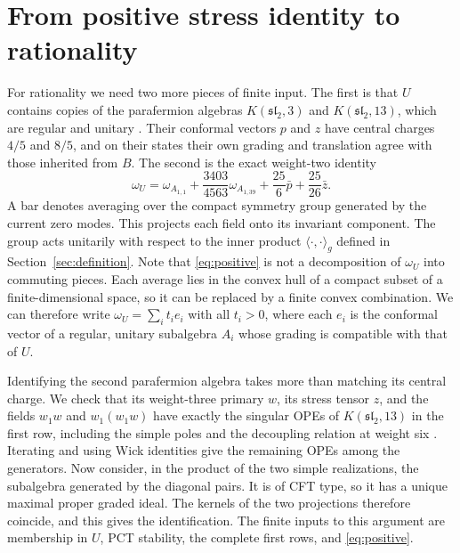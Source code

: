 \documentclass[11pt,a4paper]{article}
\begin{document}
\section{From positive stress identity to rationality}\label{sec:rationality}

For rationality we need two more pieces of finite input. The first is
that $U$ contains copies of the parafermion algebras
$K(\mathfrak{sl}_2,3)$ and $K(\mathfrak{sl}_2,13)$, which are regular
and unitary \cite{ALY}. Their conformal vectors $p$ and $z$ have
central charges $4/5$ and $8/5$, and on their states their own grading
and translation agree with those inherited from $B$. The second is the
exact weight-two identity
\begin{equation}\label{eq:positive}
 \omega_U=\omega_{A_{1,1}}+\frac{3403}{4563}\omega_{A_{1,39}}
                      +\frac{25}{6}\bar p+\frac{25}{26}\bar z.
\end{equation}
A bar denotes averaging over the compact symmetry group generated
by the current zero modes. This projects each field onto its
invariant component. The group acts unitarily with respect to the inner product
$\langle\cdot,\cdot\rangle_g$ defined in
Section~\ref{sec:definition}. Note that
\eqref{eq:positive} is not a decomposition of $\omega_U$ into
commuting pieces. Each average lies in the convex hull of a compact
subset of a finite-dimensional space, so it can be replaced by a
finite convex combination. We can therefore write
$\omega_U=\sum_i t_ie_i$ with all $t_i>0$, where each $e_i$ is the
conformal vector of a regular, unitary subalgebra $A_i$ whose grading
is compatible with that of $U$.

Identifying the second parafermion algebra takes more than matching
its central charge. We check that its weight-three primary $w$, its
stress tensor $z$, and the fields $w_1w$ and $w_1(w_1w)$ have exactly
the singular OPEs of $K(\mathfrak{sl}_2,13)$ in the first row,
including the simple poles and the decoupling relation at weight six
\cite{DLY,Linshaw}. Iterating and using Wick identities give the
remaining OPEs among the generators. Now consider, in the product of
the two simple realizations, the subalgebra generated by the diagonal
pairs. It is of CFT type, so it has a unique maximal proper graded
ideal. The kernels of the two projections therefore coincide, and this
gives the identification. The finite inputs to this argument are
membership in $U$, PCT stability, the complete first rows, and
\eqref{eq:positive}.
\end{document}
